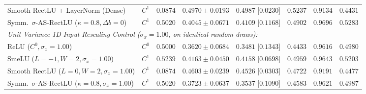 \documentclass[10pt,a4paper]{article}
\begin{document}
\begin{table}[t]
\begin{tabular}{llcccccc}
Smooth RectLU + LayerNorm (Dense) & $C^1$ & $0.0874$ & $0.4970 \pm 0.0193$ & $0.4987$ [$0.0230$] & $0.5237$ & $0.9134$ & $0.4431$ \\
Symm.\ $\sigma$-AS-RectLU ($\kappa=0.8, \Delta b=0$) & $C^1$ & $0.5020$ & $0.4045 \pm 0.0671$ & $0.4109$ [$0.1168$] & $0.4902$ & $0.9696$ & $0.5283$ \\
\midrule
\multicolumn{8}{l}{\textit{Unit-Variance 1D Input Rescaling Control ($\sigma_x = 1.00$, on identical random draws):}} \\
ReLU ($C^0, \sigma_x=1.00$) & $C^0$ & $0.5000$ & $0.3620 \pm 0.0684$ & $0.3481$ [$0.1343$] & $0.4433$ & $0.9616$ & $0.4980$ \\
SmeLU ($L=-1, W=2, \sigma_x=1.00$) & $C^1$ & $0.5239$ & $0.4163 \pm 0.0450$ & $0.4158$ [$0.0698$] & $0.4959$ & $0.9643$ & $0.5203$ \\
Smooth RectLU ($L=0, W=2, \sigma_x=1.00$) & $C^1$ & $0.0874$ & $0.4603 \pm 0.0239$ & $0.4526$ [$0.0303$] & $0.4722$ & $0.9191$ & $0.4477$ \\
Symm.\ $\sigma$-AS-RectLU ($\kappa=0.8, \sigma_x=1.00$) & $C^1$ & $0.5020$ & $0.3723 \pm 0.0637$ & $0.3537$ [$0.1090$] & $0.4583$ & $0.9621$ & $0.4987$ \\
\bottomrule
\end{tabular}
\end{table}
\end{document}
